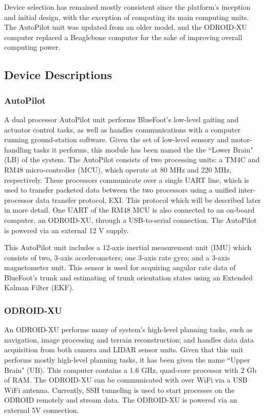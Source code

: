 		Device selection has remained mostly consistent since the platform's inception and initial design, with the exception of computing its main computing units. The AutoPilot unit was updated from an older model, and the ODROID-XU computer replaced a Beaglebone computer for the sake of improving overall computing power.

		\subsection{Device Descriptions}
	
			\subsubsection{AutoPilot}

				A dual processor AutoPilot unit performs BlueFoot's low-level gaiting and actuator control tasks, as well as handles communications with a computer running ground-station software. Given the set of low-level sensory and motor-handling tasks it performs, this module has been named the the ``Lower Brain" (LB) of the system. The AutoPilot consists of two processing units: a TM4C and RM48 micro-controller (MCU), which operate at 80 MHz and 220 MHz, respectively. These processors communicate over a single UART line, which is used to transfer packeted data between the two processors using a unified inter-processor data transfer protocol, EXI. This protocol which will be described later in more detail. One UART of the RM48 MCU is also connected to an on-board computer, an ODROID-XU, through a USB-to-serial connection. The AutoPilot is powered via an external 12 V supply.
	
				This AutoPilot unit includes a 12-axis inertial measurement unit (IMU) which consists of two, 3-axis accelerometers; one 3-axis rate gyro; and a 3-axis magnetometer unit. This sensor is used for acquiring angular rate data of BlueFoot's trunk and estimating of trunk orientation states using an Extended Kalman Filter (EKF). 
				
			\subsubsection{ODROID-XU}

				An ODROID-XU performs many of system's high-level planning tasks, such as navigation, image processing and terrain reconstruction; and handles data data acquisition from both camera and LIDAR sensor units. Given that this unit performs mostly high-level planning tasks, it has been given the name ``Upper Brain" (UB). This computer contains a 1.6 GHz, quad-core processor with 2 Gb of RAM. The ODROID-XU can be communicated with over WiFi via a USB WiFi antenna. Currently, SSH tunneling is used to start processes on the ODROID remotely and stream data. The ODROID-XU is powered via an external 5V connection.

